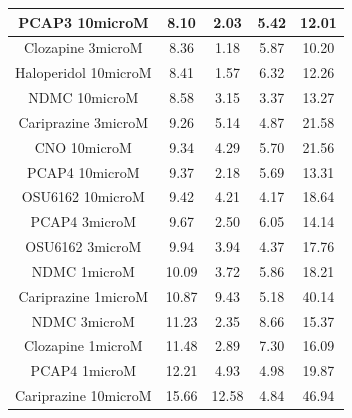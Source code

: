 \documentclass[a4paper,12pt]{article}
\begin{document}
\begin{table}[h!]
\begin{tabular}{|c|c|c|c|c|}
PCAP3 10microM      & 8.10   & 2.03  & 5.42 & 12.01 \\ \hline
Clozapine 3microM     & 8.36  & 1.18  & 5.87 & 10.20  \\ \hline
Haloperidol 10microM  & 8.41  & 1.57  & 6.32 & 12.26 \\ \hline
NDMC 10microM         & 8.58  & 3.15  & 3.37 & 13.27 \\ \hline
Cariprazine 3microM   & 9.26  & 5.14  & 4.87 & 21.58 \\ \hline
CNO 10microM          & 9.34  & 4.29  & 5.70  & 21.56 \\ \hline
PCAP4 10microM      & 9.37  & 2.18  & 5.69 & 13.31 \\ \hline
OSU6162 10microM      & 9.42  & 4.21  & 4.17 & 18.64 \\ \hline
PCAP4 3microM       & 9.67  & 2.50   & 6.05 & 14.14 \\ \hline
OSU6162 3microM       & 9.94  & 3.94  & 4.37 & 17.76 \\ \hline
NDMC 1microM          & 10.09 & 3.72  & 5.86 & 18.21 \\ \hline
Cariprazine 1microM   & 10.87 & 9.43  & 5.18 & 40.14 \\ \hline
NDMC 3microM          & 11.23 & 2.35  & 8.66 & 15.37 \\ \hline
Clozapine 1microM     & 11.48 & 2.89  & 7.30  & 16.09 \\ \hline
PCAP4 1microM       & 12.21 & 4.93  & 4.98 & 19.87 \\ \hline
Cariprazine 10microM  & 15.66 & 12.58 & 4.84 & 46.94 \\\hline
\end{tabular}
\end{table}
\newpage
\end{document}
